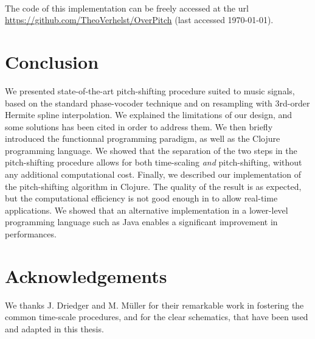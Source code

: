 \documentclass[letterpaper]{article}
\theoremstyle{definition}
\theoremstyle{remark}
\begin{document}
\paragraph{}
The code of this implementation can be freely accessed at the url
\url{https://github.com/TheoVerhelst/OverPitch} (last accessed \today).

\section{Conclusion}
We presented state-of-the-art pitch-shifting procedure suited to music signals,
based on the standard phase-vocoder technique and on resampling with 3rd-order
Hermite spline interpolation. We explained the limitations of our design, and
some solutions has been cited in order to address them. We then briefly
introduced the functionnal programming paradigm, as well as the Clojure
programming language. We showed that the separation of the two steps in the
pitch-shifting procedure allows for both time-scaling \emph{and} pitch-shifting,
without any additional computational cost. Finally, we described our
implementation of the pitch-shifting algorithm in Clojure. The quality of the
result is as expected, but the computational efficiency is not good enough in to
allow real-time applications. We showed that an alternative implementation in a
lower-level programming language such as Java enables a significant improvement
in performances.

\section{Acknowledgements}
We thanks J. Driedger and M. Müller for their remarkable work in fostering the
common time-scale procedures, and for the clear schematics, that have been
used and adapted in this thesis.

\footnotesize


\end{document}
